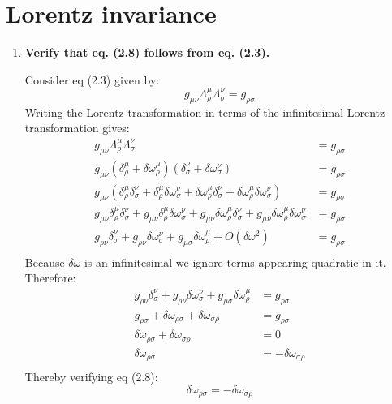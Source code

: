 \documentclass[9pt]{report}
\begin{document}
  \chapter{Lorentz invariance}
  \begin{enumerate}
    \item \textbf{Verify that eq. (2.8) follows from eq. (2.3).}

      Consider eq (2.3) given by:
      \[
        g_{\mu\nu} \Lambda^\mu_\rho \Lambda^\nu_\sigma = g_{\rho\sigma}
      \]
      Writing the Lorentz transformation in terms of the infinitesimal
      Lorentz transformation gives:
      \[
        \begin{align}
        g_{\mu\nu} \Lambda^\mu_\rho \Lambda^\nu_\sigma &= g_{\rho\sigma}\\
        g_{\mu\nu} (\delta^\mu_\rho + \delta\omega^\mu_\rho)(\delta^\nu_\sigma+\delta\omega^\nu_\sigma) &= g_{\rho\sigma}\\
        g_{\mu\nu} (\delta^\mu_\rho \delta^\nu_\sigma + \delta^\mu_\rho \delta\omega^\nu_\sigma+\delta\omega^\mu_\rho\delta^\nu_\sigma+\delta\omega^\mu_\rho\delta\omega^\nu_\sigma) &= g_{\rho\sigma}\\
        g_{\mu\nu}\delta^\mu_\rho \delta^\nu_\sigma + g_{\mu\nu}\delta^\mu_\rho \delta\omega^\nu_\sigma+g_{\mu\nu}\delta\omega^\mu_\rho\delta^\nu_\sigma+g_{\mu\nu}\delta\omega^\mu_\rho\delta\omega^\nu_\sigma &= g_{\rho\sigma}\\
        g_{\rho\nu}\delta^\nu_\sigma + g_{\rho\nu} \delta\omega^\nu_\sigma+g_{\mu\sigma}\delta\omega^\mu_\rho+O(\delta\omega^2)&= g_{\rho\sigma}\\
        \end{align}
      \]
      Because $\delta\omega$ is an infinitesimal we ignore terms appearing quadratic
      in it. Therefore:
      \[
        \begin{align}
        g_{\rho\nu}\delta^\nu_\sigma + g_{\rho\nu} \delta\omega^\nu_\sigma+g_{\mu\sigma}\delta\omega^\mu_\rho&= g_{\rho\sigma}\\
        g_{\rho\sigma}+ \delta\omega_{\rho\sigma}+\delta\omega_{\sigma\rho}&= g_{\rho\sigma}\\
        \delta\omega_{\rho\sigma}+\delta\omega_{\sigma\rho}&= 0\\
        \delta\omega_{\rho\sigma}&=-\delta\omega_{\sigma\rho}\\
        \end{align}
      \]
      Thereby verifying eq (2.8):
      \[
          \delta\omega_{\rho\sigma} = -\delta\omega_{\sigma\rho}
\]
\end{enumerate}
\end{document}
